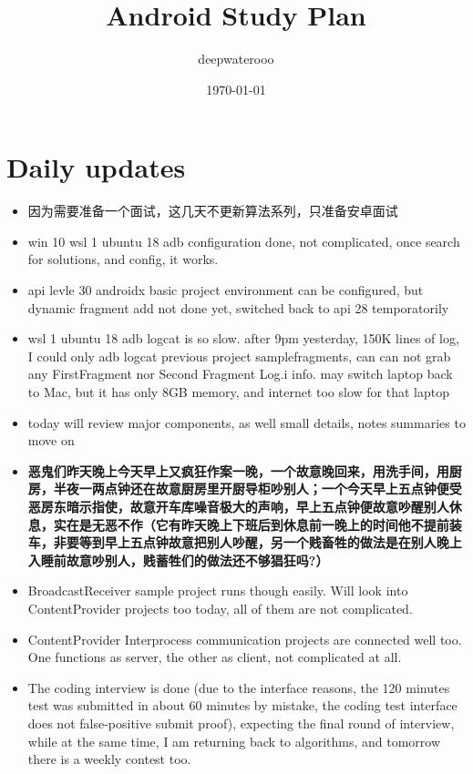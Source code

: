 \documentclass[9pt, b5paper]{article}
\author{deepwaterooo}
\date{\today}
\title{Android Study Plan}
\begin{document}
\maketitle
\tableofcontents


\section{Daily updates}
\label{sec-1}
\begin{itemize}
\item 因为需要准备一个面试，这几天不更新算法系列，只准备安卓面试
\item win 10 wsl 1 ubuntu 18 adb configuration done, not complicated, once search for solutions, and config, it works.
\item api levle 30 androidx basic project environment can be configured, but dynamic fragment add not done yet, switched back to api 28 temporatorily
\item wsl 1 ubuntu 18 adb logcat is so slow. after 9pm yesterday, 150K lines of log, I could only adb logcat previous project samplefragments, can can not grab any FirstFragment nor Second Fragment Log.i info. may switch laptop back to Mac, but it has only 8GB memory, and internet too slow for that laptop
\item today will review major components, as well small details, notes summaries to move on
\item \textbf{恶鬼们昨天晚上今天早上又疯狂作案一晚，一个故意晚回来，用洗手间，用厨房，半夜一两点钟还在故意厨房里开厨导柜吵别人；一个今天早上五点钟便受恶房东暗示指使，故意开车库噪音极大的声响，早上五点钟便故意吵醒别人休息，实在是无恶不作（它有昨天晚上下班后到休息前一晚上的时间他不提前装车，非要等到早上五点钟故意把别人吵醒，另一个贱畜牲的做法是在别人晚上入睡前故意吵别人，贱蓄牲们的做法还不够猖狂吗?）}
\item BroadcastReceiver sample project runs though easily. Will look into ContentProvider projects too today, all of them are not complicated.
\item ContentProvider Interprocess communication projects are connected well too. One functions as server, the other as client, not complicated at all.
\item The coding interview is done (due to the interface reasons, the 120 minutes test was submitted in about 60 minutes by mistake, the coding test interface does not false-positive submit proof), expecting the final round of interview, while at the same time, I am returning back to algorithms, and tomorrow there is a weekly contest too.
\end{itemize}
\end{document}
